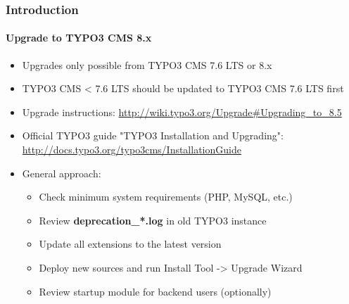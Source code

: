 \begin{frame}[fragile]
	\frametitle{Introduction}
	\framesubtitle{Upgrade to TYPO3 CMS 8.x}

	\begin{itemize}
		\item Upgrades only possible from TYPO3 CMS 7.6 LTS or 8.x
		\item TYPO3 CMS < 7.6 LTS should be updated to TYPO3 CMS 7.6 LTS first
	\end{itemize}

	\begin{itemize}

		\item Upgrade instructions:\newline
			\smaller\url{http://wiki.typo3.org/Upgrade#Upgrading_to_8.5}\normalsize
		\item Official TYPO3 guide "TYPO3 Installation and Upgrading":
			\smaller\url{http://docs.typo3.org/typo3cms/InstallationGuide}\normalsize
		\item General approach:
			\begin{itemize}
				\item Check minimum system requirements \small(PHP, MySQL, etc.)
				\item Review \textbf{deprecation\_*.log} in old TYPO3 instance
				\item Update all extensions to the latest version
				\item Deploy new sources and run Install Tool -> Upgrade Wizard
				\item Review startup module for backend users (optionally)
			\end{itemize}
	\end{itemize}

\end{frame}


